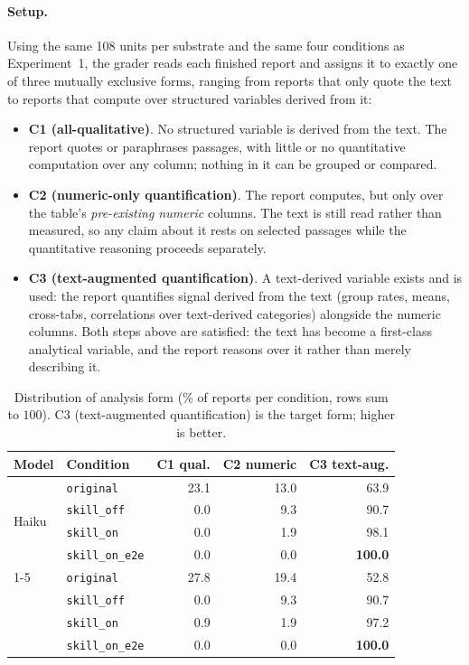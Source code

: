 \paragraph{Setup.} Using the same 108 units per substrate and the same four conditions as Experiment~1, the grader reads each finished report and assigns it to exactly one of three mutually exclusive forms, ranging from reports that only quote the text to reports that compute over structured variables derived from it:
\begin{itemize}
\item \textbf{C1 (all-qualitative)}. No structured variable is derived from the text. The report quotes or paraphrases passages, with little or no quantitative computation over any column; nothing in it can be grouped or compared.
\item \textbf{C2 (numeric-only quantification)}. The report computes, but only over the table's \emph{pre-existing numeric} columns. The text is still read rather than measured, so any claim about it rests on selected passages while the quantitative reasoning proceeds separately.
\item \textbf{C3 (text-augmented quantification)}. A text-derived variable exists and is used: the report quantifies signal derived from the text (group rates, means, cross-tabs, correlations over text-derived categories) alongside the numeric columns. Both steps above are satisfied: the text has become a first-class analytical variable, and the report reasons over it rather than merely describing it.
\end{itemize}

\begin{table}[t]
\centering
\caption{Distribution of analysis form (\% of reports per condition, rows sum to $100$). C3 (text-augmented quantification) is the target form; higher is better.}
\label{tab:form-class}
\footnotesize
\setlength{\tabcolsep}{4pt}
\begin{tabular}{llrrr}
\toprule
Model & Condition & C1 qual. & C2 numeric & C3 text-aug. \\
\midrule
\multirow{4}{*}{Haiku}
 & \texttt{original}       & 23.1 & 13.0 & 63.9 \\
 & \texttt{skill\_off}     & 0.0 & 9.3 & 90.7 \\
 & \texttt{skill\_on}      & 0.0 & 1.9 & 98.1 \\
 & \texttt{skill\_on\_e2e} & 0.0 & 0.0 & \textbf{100.0} \\
\cmidrule(lr){1-5}
\multirow{4}{*}{Sonnet}
 & \texttt{original}       & 27.8 & 19.4 & 52.8 \\
 & \texttt{skill\_off}     & 0.0 & 9.3 & 90.7 \\
 & \texttt{skill\_on}      & 0.9 & 1.9 & 97.2 \\
 & \texttt{skill\_on\_e2e} & 0.0 & 0.0 & \textbf{100.0} \\
\bottomrule
\end{tabular}
\end{table}

